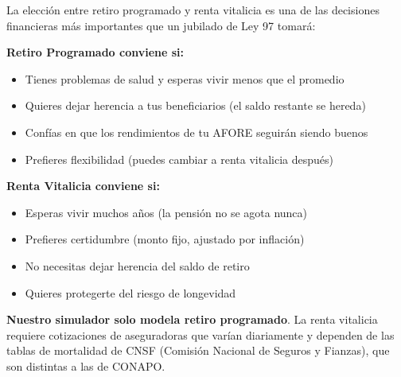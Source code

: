 \documentclass[11pt,a4paper]{report}
\begin{document}
\begin{tcolorbox}[colback=green!5!white, colframe=green!50!black, title=\textbf{Intuici\'on}]
La elecci\'on entre retiro programado y renta vitalicia es una de las decisiones financieras m\'as importantes que un jubilado de Ley 97 tomar\'a:

\textbf{Retiro Programado conviene si:}
\begin{itemize}[nosep]
\item Tienes problemas de salud y esperas vivir menos que el promedio
\item Quieres dejar herencia a tus beneficiarios (el saldo restante se hereda)
\item Conf\'ias en que los rendimientos de tu AFORE seguir\'an siendo buenos
\item Prefieres flexibilidad (puedes cambiar a renta vitalicia despu\'es)
\end{itemize}

\textbf{Renta Vitalicia conviene si:}
\begin{itemize}[nosep]
\item Esperas vivir muchos a\~nos (la pensi\'on no se agota nunca)
\item Prefieres certidumbre (monto fijo, ajustado por inflaci\'on)
\item No necesitas dejar herencia del saldo de retiro
\item Quieres protegerte del riesgo de longevidad
\end{itemize}

\textbf{Nuestro simulador solo modela retiro programado}. La renta vitalicia requiere cotizaciones de aseguradoras que var\'ian diariamente y dependen de las tablas de mortalidad de CNSF (Comisi\'on Nacional de Seguros y Fianzas), que son distintas a las de CONAPO.
\end{tcolorbox}
\end{document}
